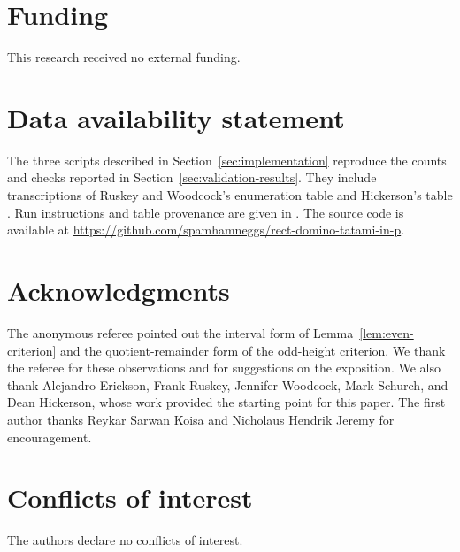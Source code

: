 \documentclass[11pt, reqno]{amsart}
\theoremstyle{definition}
\theoremstyle{remark}
\numberwithin{equation}{section}
\begin{document}
\section*{Funding}

This research received no external funding.

\section*{Data availability statement}

The three scripts described in Section~\ref{sec:implementation} reproduce the counts and
checks reported in Section~\ref{sec:validation-results}. They include transcriptions of
Ruskey and Woodcock's enumeration table \cite[Table~2]{ruskey} and
Hickerson's table \cite{hickerson}. Run instructions and table provenance
are given in . The source code is available at
\url{https://github.com/spamhamneggs/rect-domino-tatami-in-p}.

\section*{Acknowledgments}

The anonymous referee pointed out the interval form of
Lemma~\ref{lem:even-criterion} and the quotient-remainder form of the
odd-height criterion. We thank the referee for these observations and
for suggestions on the exposition. We also thank Alejandro Erickson,
Frank Ruskey, Jennifer Woodcock, Mark Schurch, and Dean Hickerson,
whose work provided the starting point for this paper. The first author
thanks Reykar Sarwan Koisa and Nicholaus Hendrik Jeremy for encouragement.

\section*{Conflicts of interest}

The authors declare no conflicts of interest.



\end{document}
